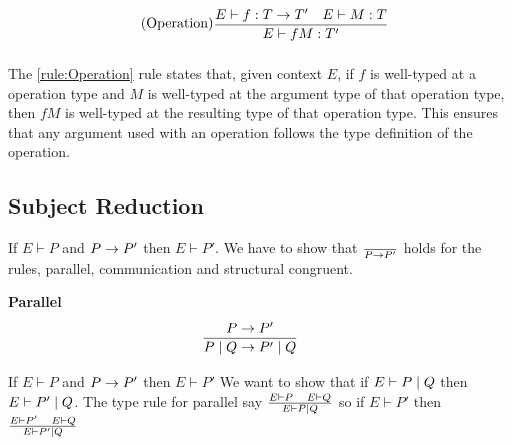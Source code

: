 \begin{align*}
\tag{Operation}\label{rule:Operation} &\infrule{E\vdash f:T\ra T'\quad E\vdash M:T}{E\vdash fM:T'}
\end{align*}
The \ref{rule:Operation} rule states that, given context $E$, if $f$ is well-typed at a operation type and $M$ is well-typed at the argument type of that operation type, then $fM$ is well-typed at the resulting type of that operation type.
This ensures that any argument used with an operation follows the type definition of the operation.



\subsection{Subject Reduction}
If \ensuremath{E \vdash P} and \ensuremath{P\ra P'} then \ensuremath{E \vdash P'}.
We have to show that \ensuremath{\frac{}{P \ra P'}} holds for the rules, parallel, communication and structural congruent.

\textbf{Parallel}
\begin{align*}
\infrule{P \ra P'}{P \para Q \ra P' \para Q}
\end{align*}
If \ensuremath{E \vdash P} and \ensuremath{P \ra P'} then \ensuremath{E \vdash P'} We want to show that if \ensuremath{E \vdash P \para Q} then \ensuremath{E \vdash P' \para Q}. The type rule for parallel say \ensuremath{\frac{E \vdash P\quad E \vdash Q}{E \vdash P \para Q}} so if \ensuremath{E \vdash P'} then \ensuremath{\frac{E \vdash P' \quad E \vdash Q}{E \vdash P' \para Q}}

